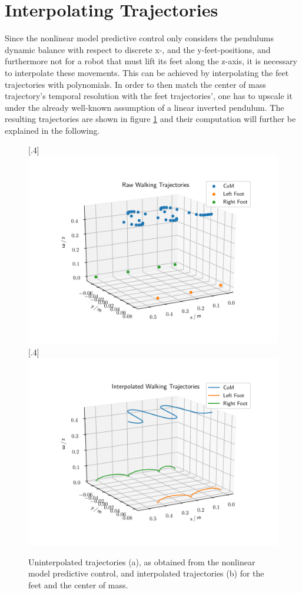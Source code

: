 
\FloatBarrier
\section{Interpolating Trajectories}
\label{sec::23_it}
Since the nonlinear model predictive control only considers the pendulums dynamic balance with respect to discrete x-, and the y-feet-positions, and furthermore not for a robot that must lift its feet along the z-axis, it is necessary to interpolate these movements. This can be achieved by interpolating the feet trajectories with polynomials. In order to then match the center of mass trajectory's temporal resolution with the feet trajectories', one has to upscale it under the already well-known assumption of a linear inverted pendulum. The resulting trajectories are shown in figure \ref{fig::23_ip} and their computation  will further be explained in the following. 
\begin{figure}[h!]
	\centering
	\subcaptionbox{}%
	[.4\linewidth]{\includegraphics[scale=.4]{chapters/02_foundations_for_humanoid_walking/img/raw_results.png}}
	\subcaptionbox{}%
	[.4\linewidth]{\includegraphics[scale=.4]{chapters/02_foundations_for_humanoid_walking/img/interpolated_results.png}}
	\caption{Uninterpolated trajectories (a), as obtained from the nonlinear model predictive control, and interpolated trajectories (b) for the feet and the center of mass.}
	\label{fig::23_ip}
\end{figure}

